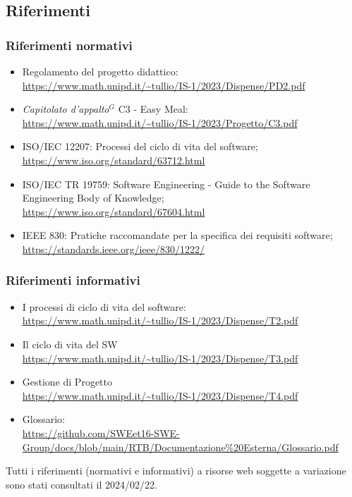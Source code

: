\subsection{Riferimenti}
\subsubsection{Riferimenti normativi}

        \begin{itemize}
            \item Regolamento del progetto didattico: \\
            \url{https://www.math.unipd.it/~tullio/IS-1/2023/Dispense/PD2.pdf}
            \item \emph{Capitolato d’appalto}$^{G}$ C3 - Easy Meal: \\
            \url{https://www.math.unipd.it/~tullio/IS-1/2023/Progetto/C3.pdf} \\
            \item ISO/IEC 12207: Processi del ciclo di vita del software;\\
            \url{https://www.iso.org/standard/63712.html}
            \item ISO/IEC TR 19759: Software Engineering - Guide to the Software Engineering Body of Knowledge; \\
            \url{https://www.iso.org/standard/67604.html}
            \item IEEE 830: Pratiche raccomandate per la specifica dei requisiti software;\\
            \url{https://standards.ieee.org/ieee/830/1222/}
        \end{itemize}

        \subsubsection{Riferimenti informativi}

        \begin{itemize}
            \item I processi di ciclo di vita del software: \\
            \url{https://www.math.unipd.it/~tullio/IS-1/2023/Dispense/T2.pdf}
            \item Il ciclo di vita del SW\\
            \url{https://www.math.unipd.it/~tullio/IS-1/2023/Dispense/T3.pdf}
            \item Gestione di Progetto\\
            \url{https://www.math.unipd.it/~tullio/IS-1/2023/Dispense/T4.pdf}
            \item Glossario: \\
            \url{https://github.com/SWEet16-SWE-Group/docs/blob/main/RTB/Documentazione%20Esterna/Glossario.pdf} 
        \end{itemize}

        Tutti i riferimenti (normativi e informativi) a risorse web soggette a variazione sono stati consultati il 2024/02/22.

